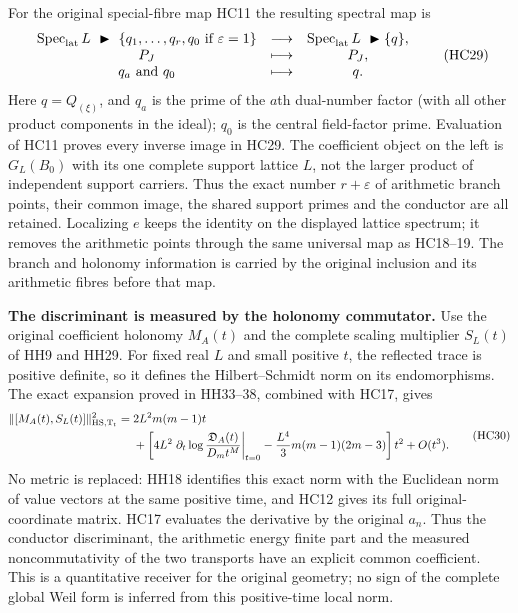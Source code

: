 \documentclass[11pt,a4paper]{article}
\theoremstyle{definition}\newtheorem{definition}[theorem]{Definition}
\begin{document}
For the original special-fibre map HC11 the resulting spectral map is
\[
 \begin{array}{ccc}
 \operatorname{Spec}_{\rm lat}L\ \blacktriangleright\
       \{q_1,\ldots,q_r,q_0\text{ if }\varepsilon=1\}
 &\longrightarrow&
 \operatorname{Spec}_{\rm lat}L\ \blacktriangleright\{q\},\\
 P_J&\longmapsto&P_J,\\
 q_a\ \text{and }q_0&\longmapsto&q.
 \end{array}
 \tag{HC29}
\]
Here $q=Q_{(\xi)}$, and $q_a$ is the prime of the $a$th dual-number
factor (with all other product components in the ideal); $q_0$
is the central field-factor prime. Evaluation of HC11 proves every
inverse image in HC29. The coefficient object on the left is
$G_L(B_0)$ with its one complete support lattice $L$, not the
larger product of independent support carriers. Thus the exact
number $r+\varepsilon$ of arithmetic branch points, their common
image, the shared support primes and the conductor are all retained.
Localizing $e$ keeps the identity on the displayed lattice spectrum;
it removes the arithmetic points through the same universal map
as HC18--19. The branch and holonomy information is carried by
the original inclusion and its arithmetic fibres before that map.

\HC\textbf{The discriminant is measured by the holonomy commutator.}
Use the original coefficient holonomy $M_A(t)$ and the complete
scaling multiplier $S_L(t)$ of HH9 and HH29. For fixed real $L$
and small positive $t$, the reflected trace is positive definite,
so it defines the Hilbert--Schmidt norm on its endomorphisms.
The exact expansion proved in HH33--38, combined with HC17, gives
\[
 \begin{split}
 \|[M_A(t),S_L(t)]\|_{\rm HS,T_t}^2
  ={}&2L^2m(m-1)t\\
   &+\left[
       4L^2\left.\partial_t\log
           \frac{\mathfrak D_A(t)}{D_m t^M}\right|_{t=0}
       -\frac{L^4}3m(m-1)(2m-3)
     \right]t^2+O(t^3).
 \end{split}
 \tag{HC30}
\]
No metric is replaced: HH18 identifies this exact norm with the
Euclidean norm of value vectors at the same positive time, and
HC12 gives its full original-coordinate matrix. HC17 evaluates
the derivative by the original $a_n$. Thus the conductor
discriminant, the arithmetic energy finite part and the measured
noncommutativity of the two transports have an explicit common
coefficient. This is a quantitative receiver for the original
geometry; no sign of the complete global Weil form is inferred
from this positive-time local norm.
\end{document}
